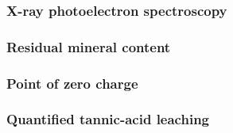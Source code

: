 \subsubsection{X-ray photoelectron spectroscopy}
\label{sec:xps-method}

\subsubsection{Residual mineral content}
\label{sec:ash-method}

\subsubsection{Point of zero charge}
\label{sec:pzc-method}

\subsubsection{Quantified tannic-acid leaching}
\label{sec:leaching-method}

